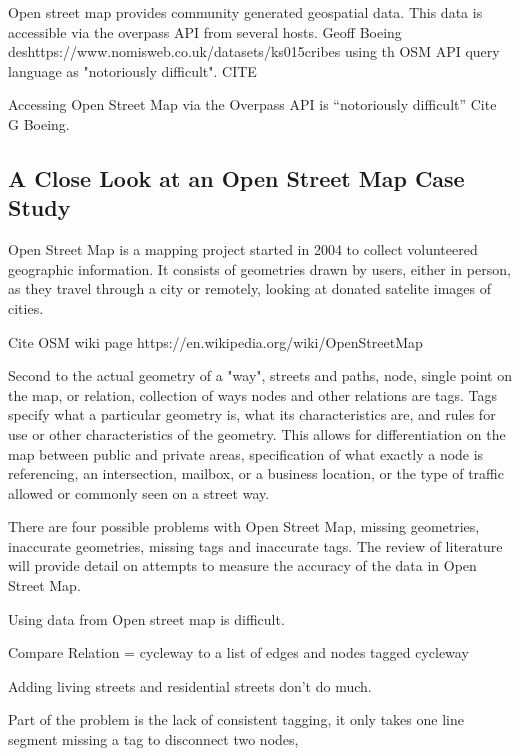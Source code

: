 \documentclass[11pt]{article} %
\begin{document}
Open street map provides community generated geospatial data. This data is accessible via the overpass API from several hosts. 
Geoff Boeing deshttps://www.nomisweb.co.uk/datasets/ks015cribes using th OSM API query language as "notoriously difficult". CITE

Accessing Open Street Map via the Overpass API is ``notoriously difficult'' Cite G Boeing. 


\subsection{A Close Look at an Open Street Map Case Study}

Open Street Map is a mapping project started in 2004 to collect volunteered geographic information. It consists of geometries drawn by users, either in person, as they travel through a city or remotely, looking at donated satelite images of cities. 

Cite OSM wiki page
https://en.wikipedia.org/wiki/OpenStreetMap

Second to the actual geometry of a "way", streets and paths, node, single point on the map, or relation, collection of ways nodes and other relations are tags. Tags specify what a particular geometry is, what its characteristics are, and rules for use or other characteristics of the geometry. This allows for differentiation on the map between public and private areas, specification of what exactly a node is referencing, an intersection, mailbox, or a business location, or the type of traffic allowed or commonly seen on a street way. 

There are four possible problems with Open Street Map, missing geometries, inaccurate geometries, missing tags and inaccurate tags. The review of literature will provide detail on attempts to measure the accuracy of the data in Open Street Map. 



Using data from Open street map is difficult. 

Compare Relation = cycleway to a list of edges and nodes tagged cycleway

Adding living streets and residential streets don't do much. 

Part of the problem is the lack of consistent tagging, it only takes one line segment missing a tag to disconnect two nodes,
\end{document}

